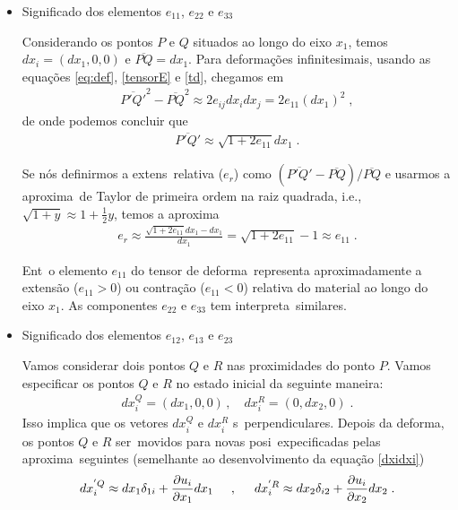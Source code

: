 \begin{itemize}
\item Significado  dos elementos $e_{11}$, $e_{22}$ e
$e_{33}$

Considerando os pontos $P$ e $Q$ situados ao longo do eixo
$x_1$, temos $dx_i = (dx_1,0,0)$ e $\overline{PQ} = dx_1$.
Para deforma\c{c}\~oes infinitesimais, usando as equa\c{c}\~oes 
\ref{eq:def}, \ref{tensorE} e \ref{td}, chegamos em
\begin{eqnarray}
\overline{P'Q'}^2 -\overline{PQ}^2 \approx 2e_{ij}dx_idx_j
= 2e_{11}(dx_1)^2 \; ,
\end{eqnarray}
de onde podemos concluir que
\begin{eqnarray}
\overline{P'Q'} \approx \sqrt{1 + 2 e_{11}} dx_1 \; .
\end{eqnarray}

Se n\'os definirmos a extens\ao\ relativa ($e_r$) como
$(\overline{P'Q'}-\overline{PQ}) / \overline{PQ}$ e usarmos
a aproxima\cao\ de Taylor de primeira ordem na raiz quadrada, i.e.,
$\sqrt{1+y}\approx 1 + \frac{1}{2}y$, temos a aproxima\cao
\begin{eqnarray}
e_r \approx \frac{\sqrt{1+2 e_{11}} dx_1-dx_1}{dx_1}
= \sqrt{1+2 e_{11}} - 1 \approx e_{11} \; .
\end{eqnarray}

Ent\ao\ o elemento $e_{11}$ do tensor de deforma\cao\
    representa aproximadamente a extens\~ao ($e_{11}>0$) ou contra\c{c}\~ao
    ($e_{11}<0$)
relativa do material ao longo do eixo $x_1$. As
componentes $e_{22}$ e $e_{33}$ tem interpreta\coes\
similares.

\item Significado  dos elementos $e_{12}$, $e_{13}$ e
$e_{23}$

Vamos considerar dois pontos $Q$ e $R$ nas proximidades
do ponto $P$. Vamos especificar os pontos $Q$ e $R$ no
estado inicial da seguinte maneira:
\begin{eqnarray}
dx_i^{Q}=(dx_1,0,0)\, , \quad dx_i^{R}
=(0,dx_2,0) \; .
\end{eqnarray}
Isso implica que os vetores $dx_i^Q$ e $dx_i^R$ s\ao\ perpendiculares.
Depois da deforma\cao, os pontos $Q$ e $R$ ser\ao\ movidos
para novas posi\coes\ expecificadas pelas aproxima\coes\
seguintes (semelhante ao desenvolvimento da equa\c{c}\~ao \ref{dxidxi})
\begin{eqnarray}
dx_i^{'Q} \approx dx_1 \delta_{1i} + \frac{\partial u_i}
{\partial x_1} dx_1
\hspace{0.5cm}, \hspace{0.5cm}
dx_i^{'R} \approx dx_2 \delta_{i2} + \frac{\partial u_i}
{\partial x_2} dx_2 \; .
\end{eqnarray}


\end{itemize}
